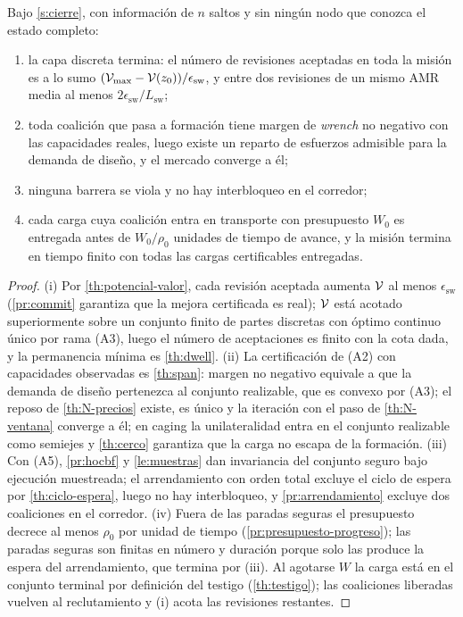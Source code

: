 \begin{teorema}
\label{th:entrega}
Bajo \cref{s:cierre}, con información de $n$ saltos y sin ningún nodo que
conozca el estado completo:
\begin{enumerate}[label=(\roman*),leftmargin=2.2em,topsep=0.2em,itemsep=0.1em]
  \item la capa discreta termina: el número de revisiones aceptadas en toda la
  misión es a lo sumo $(\mathcal{V}_{\max}-\mathcal{V}(z_0))/\epsilon_{\mathrm{sw}}$, y
  entre dos revisiones de un mismo AMR media al menos
  $2\epsilon_{\mathrm{sw}}/L_{\mathrm{sw}}$;
  \item toda coalición que pasa a formación tiene margen de \emph{wrench} no
  negativo con las capacidades reales, luego existe un reparto de esfuerzos
  admisible para la demanda de diseño, y el mercado converge a él;
  \item ninguna barrera se viola y no hay interbloqueo en el corredor;
  \item cada carga cuya coalición entra en transporte con presupuesto $W_0$ es
  entregada antes de $W_0/\rho_0$ unidades de tiempo de avance, y la misión
  termina en tiempo finito con todas las cargas certificables entregadas.
\end{enumerate}
\end{teorema}

\begin{proof}
(i) Por \cref{th:potencial-valor}, cada revisión aceptada aumenta $\mathcal{V}$ al
menos $\epsilon_{\mathrm{sw}}$ (\cref{pr:commit} garantiza que la mejora
certificada es real); $\mathcal{V}$ está acotado superiormente sobre un conjunto
finito de partes discretas con óptimo continuo único por rama (A3), luego el
número de aceptaciones es finito con la cota dada, y la permanencia mínima es
\cref{th:dwell}. (ii) La certificación de (A2) con capacidades observadas es
\cref{th:span}: margen no negativo equivale a que la demanda de diseño
pertenezca al conjunto realizable, que es convexo por (A3); el reposo de
\cref{th:N-precios} existe, es único y la iteración con el paso de
\cref{th:N-ventana} converge a él; en \textsf{caging} la unilateralidad entra
en el conjunto realizable como semiejes y \cref{th:cerco} garantiza que la
carga no escapa de la formación. (iii) Con (A5), \cref{pr:hocbf} y
\cref{le:muestras} dan invariancia del conjunto seguro bajo ejecución
muestreada; el arrendamiento con orden total excluye el ciclo de espera por
\cref{th:ciclo-espera}, luego no hay interbloqueo, y \cref{pr:arrendamiento}
excluye dos coaliciones en el corredor. (iv) Fuera de las paradas seguras el
presupuesto decrece al menos $\rho_0$ por unidad de tiempo
(\cref{pr:presupuesto-progreso}); las paradas seguras son finitas en número y
duración porque solo las produce la espera del arrendamiento, que termina por
(iii). Al agotarse $W$ la carga está en el conjunto terminal por definición
del testigo (\cref{th:testigo}); las coaliciones liberadas vuelven al
reclutamiento y (i) acota las revisiones restantes.
\end{proof}

